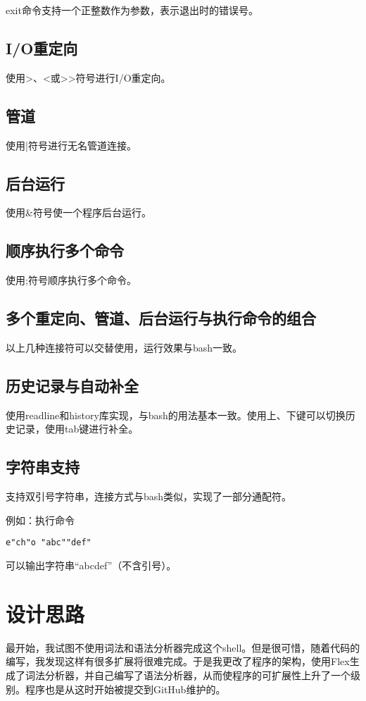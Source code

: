 \documentclass{article}
\begin{document}
exit命令支持一个正整数作为参数，表示退出时的错误号。

\subsection{I/O重定向}
使用>、<或>$ $>符号进行I/O重定向。

\subsection{管道}
使用|符号进行无名管道连接。

\subsection{后台运行}
使用\&符号使一个程序后台运行。

\subsection{顺序执行多个命令}
使用;符号顺序执行多个命令。

\subsection{多个重定向、管道、后台运行与执行命令的组合}
以上几种连接符可以交替使用，运行效果与bash一致。

\subsection{历史记录与自动补全}
使用readline和history库实现，与bash的用法基本一致。使用上、下键可以切换历史记录，使用tab键进行补全。

\subsection{字符串支持}
支持双引号字符串，连接方式与bash类似，实现了一部分通配符。

例如：执行命令

\begin{lstlisting}
e"ch"o "abc""def"
\end{lstlisting}

可以输出字符串``abcdef''（不含引号）。

\section{设计思路}
最开始，我试图不使用词法和语法分析器完成这个shell。但是很可惜，随着代码的编写，我发现这样有很多扩展将很难完成。于是我更改了程序的架构，使用Flex生成了词法分析器，并自己编写了语法分析器，从而使程序的可扩展性上升了一个级别。程序也是从这时开始被提交到GitHub维护的。
\end{document}
